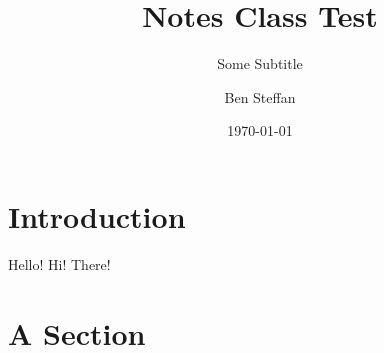 \documentclass[algebra, topology]{bsteffan-notes}
\author{Ben Steffan}
\title{Notes Class Test}
\subtitle{Some Subtitle}
\date{\today}
\begin{document}
\maketitle
\tableofcontents

\section{Introduction}
Hello!
Hi!
There!

\section{A Section}
\end{document}
